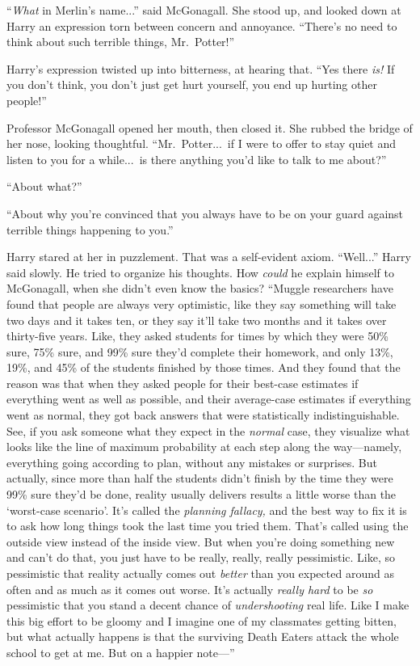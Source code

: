 “\emph{What} in Merlin’s name...” said McGonagall. She stood up, and looked down at Harry an expression torn between concern and annoyance. “There’s no need to think about such terrible things, Mr.~Potter!”

Harry’s expression twisted up into bitterness, at hearing that. “Yes there \emph{is!} If you don’t think, you don’t just get hurt yourself, you end up hurting other people!”

Professor McGonagall opened her mouth, then closed it. She rubbed the bridge of her nose, looking thoughtful. “Mr.~Potter...\ if I were to offer to stay quiet and listen to you for a while...\ is there anything you’d like to talk to me about?”

“About what?”

“About why you’re convinced that you always have to be on your guard against terrible things happening to you.”

Harry stared at her in puzzlement. That was a self-evident axiom. “Well...” Harry said slowly. He tried to organize his thoughts. How \emph{could} he explain himself to McGonagall, when she didn’t even know the basics? “Muggle researchers have found that people are always very optimistic, like they say something will take two days and it takes ten, or they say it’ll take two months and it takes over thirty-five years. Like, they asked students for times by which they were 50\% sure, 75\% sure, and 99\% sure they’d complete their homework, and only 13\%, 19\%, and 45\% of the students finished by those times. And they found that the reason was that when they asked people for their best-case estimates if everything went as well as possible, and their average-case estimates if everything went as normal, they got back answers that were statistically indistinguishable. See, if you ask someone what they expect in the \emph{normal} case, they visualize what looks like the line of maximum probability at each step along the way—namely, everything going according to plan, without any mistakes or surprises. But actually, since more than half the students didn’t finish by the time they were 99\% sure they’d be done, reality usually delivers results a little worse than the ‘worst-case scenario’. It’s called the \emph{planning fallacy,} and the best way to fix it is to ask how long things took the last time you tried them. That’s called using the outside view instead of the inside view. But when you’re doing something new and can’t do that, you just have to be really, really, really pessimistic. Like, so pessimistic that reality actually comes out \emph{better} than you expected around as often and as much as it comes out worse. It’s actually \emph{really hard} to be \emph{so} pessimistic that you stand a decent chance of \emph{undershooting} real life. Like I make this big effort to be gloomy and I imagine one of my classmates getting bitten, but what actually happens is that the surviving Death Eaters attack the whole school to get at me. But on a happier note—”

